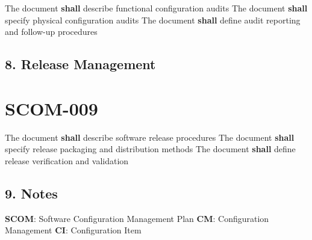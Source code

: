 The document \textbf{shall} describe functional configuration audits
The document \textbf{shall} specify physical configuration audits
The document \textbf{shall} define audit reporting and follow-up procedures

\subsection{8. Release Management}

\section{SCOM-009}\label{SCOM-009}

The document \textbf{shall} describe software release procedures
The document \textbf{shall} specify release packaging and distribution methods
The document \textbf{shall} define release verification and validation

\subsection{9. Notes}
\textbf{SCOM}: Software Configuration Management Plan
\textbf{CM}: Configuration Management
\textbf{CI}: Configuration Item

